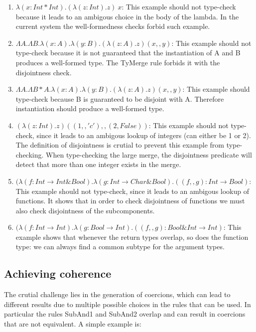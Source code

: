 \documentclass[preprint]{sigplanconf}
\begin{document}
\begin{enumerate}

\item $\lambda (x : Int * Int). (\lambda (z : Int) . z)~x$: This
  example should not type-check because it leads to an ambigous choice
  in the body of the lambda. In the current system the well-formedness
  checks forbid such example.

\item $\Lambda A.\Lambda B.\lambda (x:A).\lambda (y:B). (\lambda (z:A)
  . z) (x,,y)$: This example should not type-check because it is not
  guaranteed that the instantiation of A and B produces a well-formed
  type. The TyMerge rule forbids it with the disjointness check.

\item $\Lambda A.\Lambda B * A.\lambda (x:A).\lambda (y:B). (\lambda
  (z:A) . z) (x,,y)$: This example should type-check because B is
  guaranteed to be disjoint with A. Therefore instantiation should
  produce a well-formed type.

\item $(\lambda (z:Int) . z) ((1,,'c'),,(2,False))$: This example
  should not type-check, since it leads to an ambigous lookup of
  integers (can either be 1 or 2). The definition of disjointness is
  crutial to prevent this example from type-checking. When
  type-checking the large merge, the disjointness predicate will
  detect that more than one integer exists in the merge.

\item $(\lambda (f: Int \to Int \& Bool) . \lambda (g : Int \to Char \& Bool) . ((f,,g) : Int \to Bool)$:
  This example
  should not type-check, since it leads to an ambigous lookup of
  functions. It shows that in order to check disjointness
  of functions we must also check disjointness of the subcomponents.

\item $(\lambda (f: Int \to Int) . \lambda (g : Bool \to Int) . ((f,,g) : Bool \& Int \to Int)$:
  This example shows that whenever the return types overlap, so does the function type:
  we can always find a common subtype for the argument types.
\end{enumerate}

\subsection{Achieving coherence}

The crutial challenge lies in the generation of coercions, which can lead
to different results due to multiple possible choices in the rules that
can be used. In particular the rules SubAnd1 and SubAnd2 overlap and
can result in coercions that are not equivalent. A simple example is:
\end{document}
